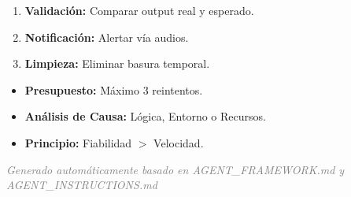 \documentclass[a3paper,landscape,12pt]{article}
\begin{document}
\begin{tcbraster}[raster columns=3, raster equal height=rows, raster column skip=1cm]
\begin{tcolorbox}[base=\faProjectDiagram\ Algoritmo de Ejecución]
\begin{enumerate}
    \item \textbf{Validación:} Comparar output real y esperado.
    \item \textbf{Notificación:} Alertar vía audios.
    \item \textbf{Limpieza:} Eliminar basura temporal.
\end{enumerate}
\vspace{0.3cm}
\begin{tcolorbox}[innerbox={accent!90!black}{\faStethoscope\ Self-Annealing (Autocuración)}]
\begin{itemize}
    \item \textbf{Presupuesto:} Máximo 3 reintentos.
    \item \textbf{Análisis de Causa:} Lógica, Entorno o Recursos.
    \item \textbf{Principio:} Fiabilidad $>$ Velocidad.
\end{itemize}
\end{tcolorbox}
\end{tcolorbox}
\end{tcbraster}

\vfill
\begin{center}
    \small \textcolor{gray}{\textit{Generado automáticamente basado en AGENT\_FRAMEWORK.md y AGENT\_INSTRUCTIONS.md}}
\end{center}
\end{document}
